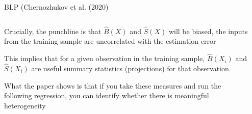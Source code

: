 \documentclass[notes,11pt, aspectratio=169]{beamer}
\newenvironment{wideitemize}{\itemize\addtolength{\itemsep}{10pt}}{\enditemize}
\begin{document}
\begin{frame}{BLP  (Chernozhukov et al. (2020)}
    \begin{columns}[onlytextwidth, T] %
      \begin{column}{.5\textwidth}
  \begin{wideitemize}
  \item Crucially, the punchline is that $\hat{B}(X)$ and $\hat{S}(X)$
    will be biased, the inputs from the training sample are
    uncorrelated with the estimation error
  \item This implies that for a given observation in the training
    sample, $\hat{B}(X_{i})$ and $\hat{S}(X_{i})$ are useful summary
    statistics (projections) for that observation.
  \item What the paper shows is that if you take these measures and
    run the following regression, you can identify whether there is
    meaningful heterogeneity
  \end{wideitemize}
      \end{column}%
      \hfill%
      \begin{column}{.5\textwidth}
      \end{column}%
    \end{columns}
\end{frame}
\end{document}
